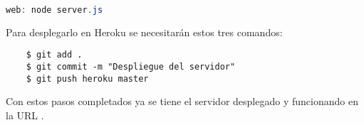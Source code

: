 \begin{lstlisting}[language=java, caption={Fichero \texttt{Procfile}.}, label={lst:Procfile},]
    web: node server.js
\end{lstlisting}

Para desplegarlo en Heroku se necesitarán estos tres comandos:

\begin{lstlisting}
    $ git add .
    $ git commit -m "Despliegue del servidor"
    $ git push heroku master
\end{lstlisting}

Con estos pasos completados ya se tiene el servidor desplegado y funcionando en la URL \cite{URL::servidorULLAR}.




